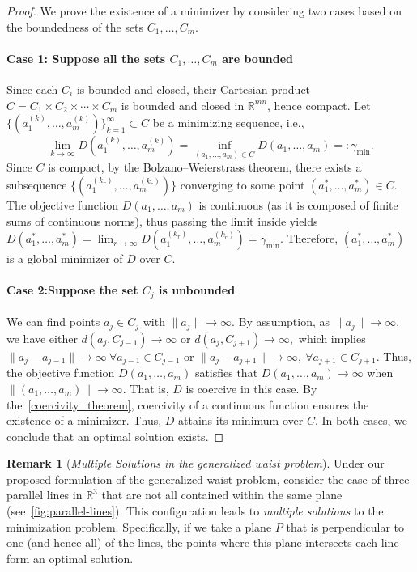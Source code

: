 \documentclass[12pt]{article}
\theoremstyle{plain}
\theoremstyle{definition}
\newtheorem{remark}[theorem]{Remark}
\begin{document}
\begin{proof}
	We prove the existence of a minimizer by considering two cases based on the boundedness of the sets $C_1, \dots, C_m$.
	\vspace{0.2cm}
	
	\paragraph{Case 1: Suppose all the sets $C_1, \dots, C_m$ are bounded}
	Since each $C_i$ is bounded and closed, their Cartesian product
	$C = C_1 \times C_2 \times \cdots \times C_m$ is bounded and closed in $\mathbb{R}^{mn}$, hence compact. Let $\{(a_1^{(k)}, \dots, a_m^{(k)})\}_{k=1}^\infty \subset C$ be a minimizing sequence, i.e.,
	\begin{equation}
		\lim_{k \to \infty} D(a_1^{(k)}, \dots, a_m^{(k)}) = \inf_{(a_1, \dots, a_m) \in C} D(a_1, \dots, a_m) =: \gamma_{\min}.
	\end{equation}
	Since $C$ is compact, by the Bolzano--Weierstrass theorem, there exists a subsequence $\{(a_1^{(k_r)}, \dots, a_m^{(k_r)})\}$ converging to some point $(a_1^*, \dots, a_m^*) \in C$. The objective function $D(a_1, \dots, a_m)$ is continuous (as it is composed of finite sums of continuous norms), thus passing the limit inside yields
	$	D(a_1^*, \dots, a_m^*) = \lim_{r \to \infty} D(a_1^{(k_r)}, \dots, a_m^{(k_r)}) = \gamma_{\min}.$ Therefore, $(a_1^*, \dots, a_m^*)$ is a global minimizer of $D$ over $C$.
	\vspace{0.3cm}
	
	\paragraph{Case 2:Suppose the set $C_j$ is unbounded}
	We can find points $a_j \in C_j$ with $\|a_j\| \to \infty$. By assumption, as $\|a_j\| \to \infty$, we have either
	$d(a_j, C_{j-1}) \to \infty$ or $d(a_j, C_{j+1}) \to \infty,$ which implies $\|a_j - a_{j-1}\| \to \infty ~ \forall a_{j-1} \in C_{j-1}$ or $\|a_j - a_{j+1}\| \to \infty, ~ \forall a_{j+1} \in C_{j+1}.$ Thus, the objective function $D(a_1, \dots, a_m)$ satisfies that $D(a_1, \dots, a_m) \to \infty$ when $\|(a_1, \dots, a_m)\| \to \infty$. That is, $D$ is coercive in this case. By the~\ref{coercivity_theorem}, coercivity of a continuous function ensures the existence of a minimizer. Thus, $D$ attains its minimum over $C$.	
	In both cases, we conclude that an optimal solution exists.
\end{proof}
\begin{remark}[\textit{Multiple Solutions in the generalized waist problem}]
	Under our proposed formulation of the generalized waist problem, consider the case of three parallel lines in $\mathbb{R}^3$ that are not all contained within the same plane (see~\ref{fig:parallel-lines}). This configuration leads to \emph{multiple solutions} to the minimization problem. Specifically, if we take a plane \( P \) that is perpendicular to one (and hence all) of the lines, the points where this plane intersects each line form an optimal solution.	
\end{remark}
\end{document}
